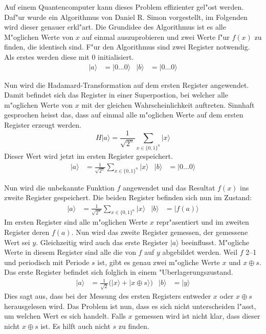 \begin{refsection}
Auf einem Quantencomputer kann dieses Problem effizienter gel"ost werden.
Daf"ur wurde ein Algorithmus von Daniel R. Simon vorgestellt, im Folgenden wird
dieser genauer erkl"art.
Die Grundidee des Algorithmus ist es alle M"oglichen Werte von $x$ auf einmal
auszuprobieren und zwei Werte f"ur $f(x)$ zu finden, die identisch sind.
F"ur den Algorithmus sind zwei Register notwendig. Als erstes werden diese mit
0 initialisiert.
\begin{align*}
  |a\rangle&=|0 \dots 0 \rangle 
  &
  |b\rangle&=|0 \dots 0 \rangle 
\end{align*}

Nun wird die Hadamard-Transformation auf dem ersten Register angewendet. Damit
befindet sich das Register in einer Superpostion, bei welcher alle m"oglichen
Werte von $x$ mit der gleichen Wahrscheinlichkeit auftreten. Sinnhaft
gesprochen heisst das, dass auf einmal alle m"oglichen Werte auf dem ersten
Register erzeugt werden.
\[ 
    H|a\rangle=\frac{1}{\sqrt{2^n}} \sum_{x\in\{0,1\}^n}{|x\rangle}
\]
Dieser Wert wird jetzt im ersten Register gespeichert.
\begin{align*}
  |a\rangle &= \frac{1}{\sqrt{2^n}} \sum_{x\in\{0,1\}^n} {|x\rangle} &
  |b\rangle&=|0 \dots 0 \rangle 
\end{align*}

Nun wird die unbekannte Funktion $f$ angewendet und das Resultat $f(x)$ ins
zweite Register gespeichert. Die beiden Register befinden sich nun im Zustand:
\begin{align*}
  |a\rangle &= \frac{1}{\sqrt{2^n}} \sum_{x\in\{0,1\}^n} {|x\rangle} &
  |b\rangle &= |f(a)\rangle
\end{align*}
Im ersten Register sind alle m"oglichen Werte $x$ repr"asentiert und im zweiten
Register deren $f(a)$. Nun wird das zweite Register gemessen, der gemessene Wert
sei $y$. 
Gleichzeitig wird auch das erste Register $|a\rangle$ beeinflusst.
M"ogliche Werte in diesem Register sind alle die von $f$ auf $y$ abgebildet
werden. Weil $f$ 2--1 und periodisch mit Periode $s$ ist, gibt es genau zwei
m"ogliche Werte $x$ und $x \oplus s$. Das erste Register befindet sich folglich
in einem "Uberlagerungszustand. 
\begin{align*}
  |a\rangle &= \frac{1}{\sqrt{2}} \bigl( |x\rangle + |x \oplus s \rangle \bigr)
  &
  |b\rangle &= |y\rangle
\end{align*}
Dies sagt aus, dass bei der Messung des ersten Registers entweder $x$ oder $x
\oplus s$ herausgelesen wird. Das Problem ist nun, dass es sich nicht
unterscheiden l"asst, um welchen Wert es sich handelt.
Falls $x$ gemessen wird ist nicht klar, dass dieser nicht $x \oplus s$ ist. 
Es hilft auch nicht $s$ zu finden.


\end{refsection}
